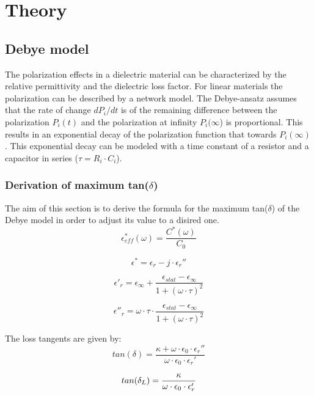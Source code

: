 \chapter{Theory}
\section{Debye model}
The polarization effects in a dielectric material can be characterized by the relative permittivity and the dielectric loss factor. 
For linear materials the polarization can be described by a network model. The Debye-ansatz assumes that the rate of change $ dP_i/dt$ is of the remaining difference between the polarization $P_i(t)$ and the polarization at infinity $P_i(\infty$) is proportional. This results in an exponential decay of the polarization function that towards $P_i(\infty)$. This exponential decay can be modeled with a time constant of a resistor and a capacitor in series ($\tau=R_i \cdot C_i$). 

\subsection{Derivation of maximum tan($\delta$)}
The aim of this section is to derive the formula for the maximum tan($\delta$) of the Debye model in order to adjust its value to a disired one.
\begin{equation}
\epsilon_{eff}^* (\omega) = \frac{C^*(\omega)}{C_0}
\end{equation}

\begin{equation}
\epsilon^* = \epsilon_r-j \cdot \epsilon_r''
\end{equation}


\begin{equation}
\epsilon'_r = \epsilon_{\infty} + \frac{\epsilon_{stat}-\epsilon_{\infty}}{1+(\omega \cdot \tau )^2}
\end{equation}

\begin{equation}
\epsilon''_r = \omega \cdot \tau \cdot \frac{\epsilon_{stat}-\epsilon_{\infty}}{1+(\omega \cdot \tau )^2}
\end{equation}

The loss tangents are given by:
\begin{equation}
tan (\delta) = \frac{\kappa + \omega \cdot \epsilon_0 \cdot \epsilon _r ''}{\omega \cdot \epsilon_0 \cdot \epsilon _r '}
\end{equation}

\begin{equation}
tan (\delta_{L}) = \frac{\kappa}{\omega \cdot \epsilon_0 \cdot \epsilon_r'} \newline
\end{equation}

